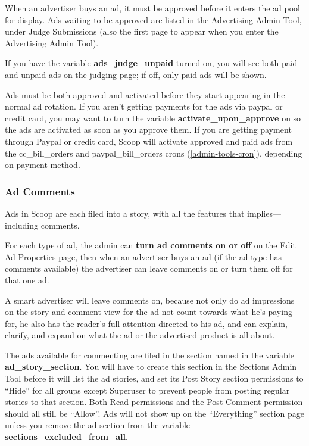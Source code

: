 When an advertiser buys an ad, it must be approved before it enters the ad pool for display.  Ads waiting to be approved are listed in the Advertising Admin Tool, under Judge Submissions (also the first page to appear when you enter the Advertising Admin Tool).

If you have the variable {\bf ads\_judge\_unpaid} turned on, you will see both paid and unpaid ads on the judging page; if off, only paid ads will be shown.

Ads must be both approved and activated before they start appearing in the normal ad rotation.  If you aren't getting payments for the ads via paypal or credit card, you may want to turn the variable {\bf activate\_upon\_approve} on so the ads are activated as soon as you approve them.  If you are getting payment through Paypal or credit card, Scoop will activate approved and paid ads from the cc\_bill\_orders and paypal\_bill\_orders crons (\ref{admin-tools-cron}), depending on payment method.

\subsubsection{Ad Comments}

Ads in Scoop are each filed into a story, with all the features that implies---including comments.

For each type of ad, the admin can {\bf turn ad comments on or off} on the Edit Ad Properties page, then when an advertiser buys an ad (if the ad type has comments available) the advertiser can leave comments on or turn them off for that one ad.

A smart advertiser will leave comments on, because not only do ad impressions on the story and comment view for the ad not count towards what he's paying for, he also has the reader's full attention directed to his ad, and can explain, clarify, and expand on what the ad or the advertised product is all about.

The ads available for commenting are filed in the section named in the variable {\bf ad\_story\_section}.  You will have to create this section in the Sections Admin Tool before it will list the ad stories, and set its Post Story section permissions to ``Hide'' for all groups except Superuser to prevent people from posting regular stories to that section.  Both Read permissions and the Post Comment permission should all still be ``Allow''.  Ads will not show up on the ``Everything'' section page unless you remove the ad section from the variable {\bf sections\_excluded\_from\_all}.

